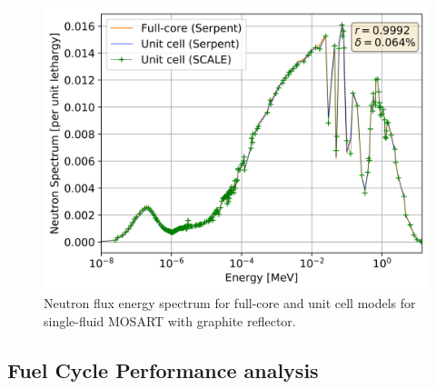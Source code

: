 \documentclass{anstrans}
\begin{document}
\begin{figure}[!htb]
  \centering
  \includegraphics[scale=0.585]{./Figures/mosart_full_vs_unit_spectrum.png}
  \caption{Neutron flux energy spectrum for full-core and unit cell models for single-fluid \gls{MOSART} with graphite reflector.}   
  \label{fig:spectrum_mosart}
\end{figure}

\subsection{Fuel Cycle Performance analysis} 
\label{sec:performance}
\end{document}
